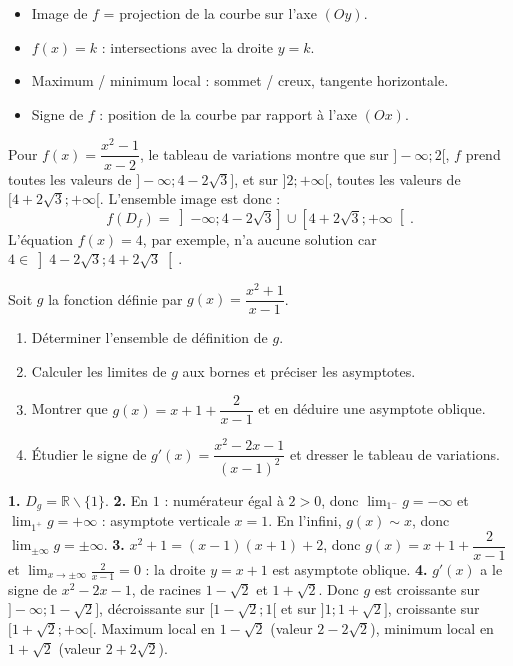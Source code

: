 \documentclass[11pt]{article}
\def\setminus{\mathbin{\backslash}}\let\smallsetminus\setminus
\begin{document}
\begin{aretenir}
\begin{itemize}
\item Image de $f$ = projection de la courbe sur l'axe $(Oy)$.
\item $f(x) = k$ : intersections avec la droite $y = k$.
\item Maximum / minimum local : sommet / creux, tangente horizontale.
\item Signe de $f$ : position de la courbe par rapport à l'axe $(Ox)$.
\end{itemize}
\end{aretenir}

\begin{exemplebox}
Pour $f(x) = \dfrac{x^2-1}{x-2}$, le tableau de variations montre que sur $]-\infty ; 2[$, $f$ prend toutes les valeurs de $]-\infty ; 4 - 2\sqrt{3}]$, et sur $]2 ; +\infty[$, toutes les valeurs de $[4 + 2\sqrt{3} ; +\infty[$. L'ensemble image est donc :
\[ f(D_f) = \left]-\infty ; 4 - 2\sqrt{3}\right] \cup \left[4 + 2\sqrt{3} ; +\infty\right[. \]
L'équation $f(x) = 4$, par exemple, n'a aucune solution car $4 \in \left]4 - 2\sqrt{3} ; 4 + 2\sqrt{3}\right[$.
\end{exemplebox}

\begin{exercice}
Soit $g$ la fonction définie par $g(x) = \dfrac{x^2 + 1}{x - 1}$.
\begin{enumerate}
\item Déterminer l'ensemble de définition de $g$.
\item Calculer les limites de $g$ aux bornes et préciser les asymptotes.
\item Montrer que $g(x) = x + 1 + \dfrac{2}{x - 1}$ et en déduire une asymptote oblique.
\item Étudier le signe de $g'(x) = \dfrac{x^2 - 2x - 1}{(x-1)^2}$ et dresser le tableau de variations.
\end{enumerate}
\end{exercice}

\begin{corrige}[Exercice 1]
\textbf{1.} $D_g = \mathbb{R} \setminus \{1\}$.
\textbf{2.} En $1$ : numérateur égal à $2 > 0$, donc $\lim_{1^-} g = -\infty$ et $\lim_{1^+} g = +\infty$ : asymptote verticale $x = 1$. En l'infini, $g(x) \sim x$, donc $\lim_{\pm\infty} g = \pm\infty$.
\textbf{3.} $x^2 + 1 = (x-1)(x+1) + 2$, donc $g(x) = x + 1 + \dfrac{2}{x-1}$ et $\lim_{x\to\pm\infty}\frac{2}{x-1} = 0$ : la droite $y = x + 1$ est asymptote oblique.
\textbf{4.} $g'(x)$ a le signe de $x^2 - 2x - 1$, de racines $1 - \sqrt{2}$ et $1 + \sqrt{2}$. Donc $g$ est croissante sur $]-\infty ; 1-\sqrt{2}]$, décroissante sur $[1-\sqrt{2} ; 1[$ et sur $]1 ; 1+\sqrt{2}]$, croissante sur $[1+\sqrt{2} ; +\infty[$. Maximum local en $1-\sqrt{2}$ (valeur $2-2\sqrt{2}$), minimum local en $1+\sqrt{2}$ (valeur $2+2\sqrt{2}$).
\end{corrige}
\end{document}
